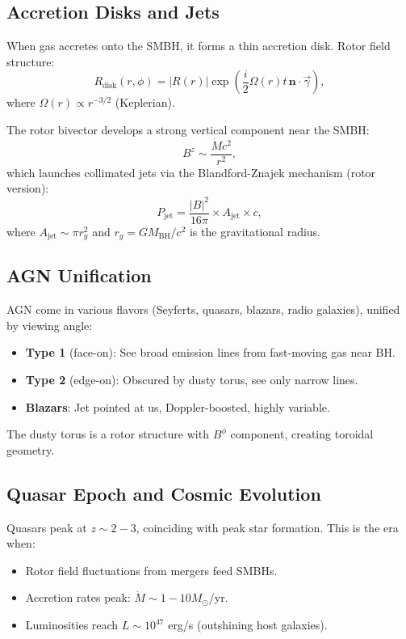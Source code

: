 \documentclass[12pt,a4paper]{article}
\theoremstyle{definition}
\theoremstyle{remark}
\begin{document}
\subsection{Accretion Disks and Jets}

When gas accretes onto the SMBH, it forms a thin accretion disk. Rotor field structure:
\begin{equation}
R_{\text{disk}}(r, \phi) = |R(r)| \exp\left(\frac{i}{2} \Omega(r) t \, \mathbf{n} \cdot \vec{\gamma}\right),
\end{equation}
where $\Omega(r) \propto r^{-3/2}$ (Keplerian).

The rotor bivector develops a strong vertical component near the SMBH:
\begin{equation}
B^{z} \sim \frac{\dot{M} c^2}{r^2},
\end{equation}
which launches collimated jets via the Blandford-Znajek mechanism (rotor version):
\begin{equation}
P_{\text{jet}} = \frac{|B|^2}{16\pi} \times A_{\text{jet}} \times c,
\end{equation}
where $A_{\text{jet}} \sim \pi r_g^2$ and $r_g = GM_{\text{BH}}/c^2$ is the gravitational radius.

\subsection{AGN Unification}

AGN come in various flavors (Seyferts, quasars, blazars, radio galaxies), unified by viewing angle:
\begin{itemize}
\item \textbf{Type 1} (face-on): See broad emission lines from fast-moving gas near BH.
\item \textbf{Type 2} (edge-on): Obscured by dusty torus, see only narrow lines.
\item \textbf{Blazars}: Jet pointed at us, Doppler-boosted, highly variable.
\end{itemize}

The dusty torus is a rotor structure with $B^{\phi}$ component, creating toroidal geometry.

\subsection{Quasar Epoch and Cosmic Evolution}

Quasars peak at $z \sim 2-3$, coinciding with peak star formation. This is the era when:
\begin{itemize}
\item Rotor field fluctuations from mergers feed SMBHs.
\item Accretion rates peak: $\dot{M} \sim 1-10 M_\odot$/yr.
\item Luminosities reach $L \sim 10^{47}$ erg/s (outshining host galaxies).
\end{itemize}
\end{document}
